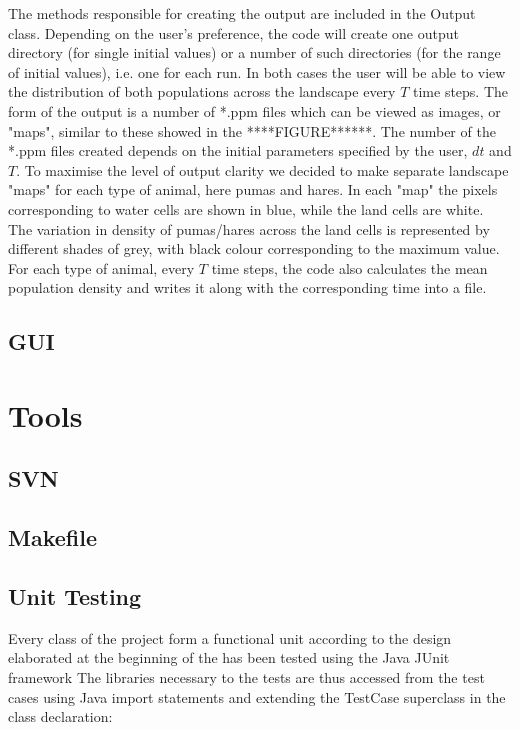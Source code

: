 \documentclass[11pt]{report}
\begin{document}
      The methods responsible for creating the output are included in the Output class. Depending on the user's preference, the code will create one output directory (for single initial values) or a number of such directories (for the range of initial values), i.e. one for each run. In both cases the user will be able to view the distribution of both populations across the landscape every $T$ time steps. The form of the output is a number of *.ppm files which can be viewed as images, or "maps", similar to these showed in the ****FIGURE******.
      \newline{}
      \newline{}
      The number of the *.ppm files created depends on the initial parameters specified by the user, $dt$ and $T$. To maximise the level of output clarity we decided to make separate landscape "maps" for each type of animal, here pumas and hares. In each "map" the pixels corresponding to water cells are shown in blue, while the land cells are white. The variation in density of pumas/hares across the land cells is represented by different shades of grey, with black colour corresponding to the maximum value. 
      \newline{}
      For each type of animal, every $T$ time steps, the code also calculates the mean population density and writes it along with the corresponding time into a file. 
      

      
      	
      
      
      \subsection{GUI} %
   
   \section{Tools}
      \subsection{SVN} %
      \subsection{Makefile} %
      \subsection{Unit Testing} %
      Every class of the project form a functional unit according to the design elaborated at the beginning of the \newline{}
  has been tested using the Java JUnit framework \newline{}
The libraries necessary to the tests are thus accessed from the test cases using Java import statements and extending the TestCase superclass in the class declaration:
\end{document}
